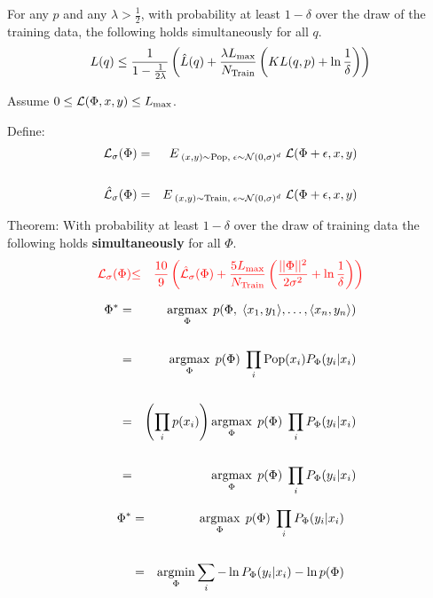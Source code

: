 {\vfill
For any $p$ and any $\lambda > \frac{1}{2}$, with probability
at least $1-\delta$ over the draw of the training data, the following holds simultaneously for all $q$.
\vfill
$$L(q) \leq \frac{1}{1-\frac{1}{2\lambda}}\left(\hat{L}(q) + \frac{\lambda L_{\max}}{N_\mathrm{Train}}\left(KL(q,p) + \ln \frac{1}{\delta}\right)\right)$$


Assume $0 \leq {\cal L}(\Phi,x,y) \leq L_{\max}$.

\vfill
Define:
\begin{eqnarray*}
{\cal L}_\sigma(\Phi) & = & E_{\;(x,y)\sim \mathrm{Pop},\;\epsilon \sim {\cal N}(0,\sigma)^d}\;{{\cal L}(\Phi+\epsilon,x,y)} \\
\\
\hat{{\cal L}}_\sigma(\Phi) & = & E_{\;(x,y)\sim \mathrm{Train},\;\epsilon \sim {\cal N}(0,\sigma)^d}\;{{\cal L}(\Phi+\epsilon,x,y)} \\
\end{eqnarray*}

\vfill
Theorem: With probability at least $1-\delta$ over the draw of training data the following holds {\bf simultaneously} for all $\Phi$.
\begin{eqnarray*}
   {\color{red} {\cal L}_\sigma(\Phi)} & {\color{red} \leq} & {\color{red} \frac{10}{9}\left(\hat{{\cal L}}_\sigma(\Phi)
   + \frac{5 L_{\max}}{N_\mathrm{Train}}\left(\frac{||\Phi||^2}{2\sigma^2} + \ln \frac{1}{\delta}\right)\right)}
\end{eqnarray*}


\vfill
{\huge
\begin{eqnarray*}
\Phi^* & = & \operatorname*{argmax}_\Phi\;p(\Phi,\;{\mbox{$\langle x_1,y_1\rangle$}},\ldots,{\mbox{$\langle x_n,y_n\rangle$}}) \\
\\
 & = & \operatorname*{argmax}_\Phi \; p(\Phi)\;\prod_i \mathrm{Pop}(x_i)P_\Phi(y_i|x_i) \\
 \\
  & = & \left(\prod_i p(x_i)\right) \operatorname*{argmax}_\Phi \; p(\Phi)\;\prod_i  P_\Phi(y_i|x_i) \\
 \\
  & = & \operatorname*{argmax}_\Phi \; p(\Phi)\;\prod_i P_\Phi(y_i|x_i)
 \end{eqnarray*}
}


\begin{eqnarray*}
\Phi^*   & = & \operatorname*{argmax}_\Phi \; p(\Phi)\;\prod_i P_\Phi(y_i|x_i) \\
\\
& = & \operatorname*{argmin}_\Phi \sum_i - \ln P_\Phi(y_i|x_i) -\ln  p(\Phi)
\end{eqnarray*}

}
